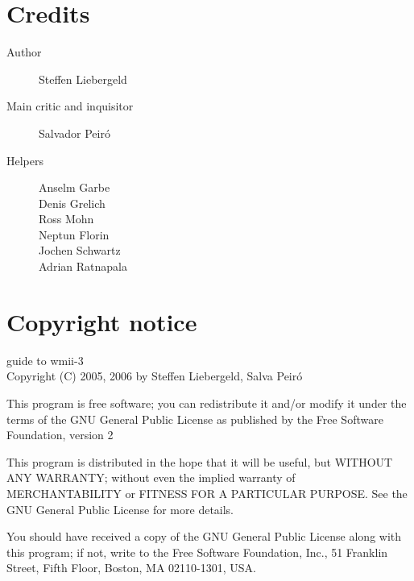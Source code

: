 \documentclass[12pt,a4paper]{article} %
\begin{document}
    \newpage

    \section{Credits}
    \label{sec:credits}


    \begin{description}
    \item [Author] Steffen Liebergeld
    \item [Main critic and inquisitor] Salvador Peir\'o

    \item [Helpers]
      Anselm Garbe \\
      Denis Grelich \\
      Ross Mohn \\
      Neptun Florin \\
      Jochen Schwartz \\
      Adrian Ratnapala \\
    \end{description}

    \section{Copyright notice}

    guide to wmii-3\\
    Copyright (C) 2005, 2006 by Steffen Liebergeld, Salva Peir\'o

    This program is free software; you can redistribute it and/or modify
    it under the terms of the GNU General Public License as published by
    the Free Software Foundation, version 2

    This program is distributed in the hope that it will be useful, but
    WITHOUT ANY WARRANTY; without even the implied warranty of
    MERCHANTABILITY or FITNESS FOR A PARTICULAR PURPOSE.  See the GNU
    General Public License for more details.

    You should have received a copy of the GNU General Public License
    along with this program; if not, write to the Free Software
    Foundation, Inc., 51 Franklin Street, Fifth Floor, Boston, MA
    02110-1301, USA.
\end{document}
